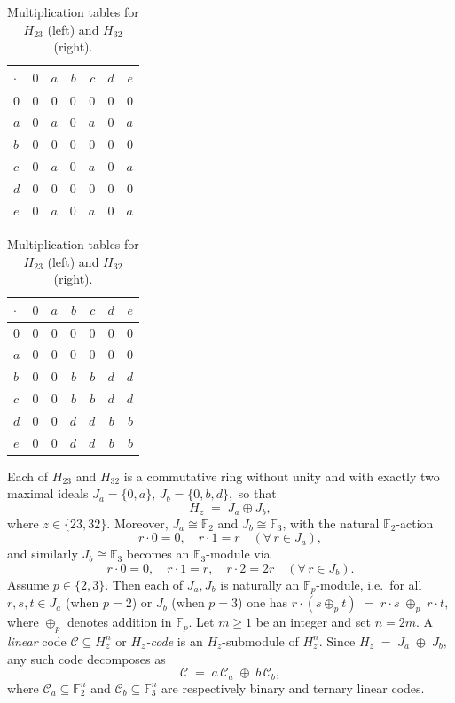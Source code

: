 \documentclass[11pt,a4paper]{article}
\theoremstyle{definition}
\numberwithin{equation}{section}
\newcommand{\F}{\mathbb{F}}
\def\C{{\mathcal{C}}}
\begin{document}
\begin{table}[h]
\centering
\begin{minipage}{0.47\linewidth}
\centering
\label{tab:mult}
\begin{tabular}{lrrrrrr}
\toprule
$\cdot$ & $0$ & $a$ & $b$ & $c$ & $d$ & $e$ \\
\midrule
$0$ & $0$ & $0$ & $0$ & $0$ & $0$ & $0$ \\
$a$ & $0$ & $a$ & $0$ & $a$ & $0$ & $a$ \\ 
$b$ & $0$ & $0$ & $0$ & $0$ & $0$ & $0$ \\
$c$ & $0$ & $a$ & $0$ & $a$ & $0$ & $a$ \\
$d$ & $0$ & $0$ & $0$ & $0$ & $0$ & $0$ \\
$e$ & $0$ & $a$ & $0$ & $a$ & $0$ & $a$ \\
\bottomrule
\end{tabular}
\end{minipage}\hfill
\begin{minipage}{0.47\linewidth}
\centering
\begin{tabular}{lrrrrrr}
\toprule
$\cdot$ & $0$ & $a$ & $b$ & $c$ & $d$ & $e$ \\
\midrule
$0$ & $0$ & $0$ & $0$ & $0$ & $0$ & $0$ \\
$a$ & $0$ & $0$ & $0$ & $0$ & $0$ & $0$ \\ 
$b$ & $0$ & $0$ & $b$ & $b$ & $d$ & $d$ \\
$c$ & $0$ & $0$ & $b$ & $b$ & $d$ & $d$ \\
$d$ & $0$ & $0$ & $d$ & $d$ & $b$ & $b$ \\
$e$ & $0$ & $0$ & $d$ & $d$ & $b$ & $b$ \\
\bottomrule
\end{tabular}
\end{minipage}
\caption{Multiplication tables for $H_{23}$ (left) and $H_{32}$ (right).}
\label{tab:mult}
\end{table}
\newpage
Each of \(H_{23}\) and \(H_{32}\) is a commutative ring without unity and with exactly two maximal ideals $J_a = \{0,a\}, \, J_b = \{0,b,d\},$
so that
\[
H_z \;=\; J_a \oplus J_b,
\]
where $z\in\{23,32\}$. Moreover, \(J_a \cong \mathbb{F}_2\) and \(J_b \cong \mathbb{F}_3\),  with the natural \(\F_2\)-action
\[
r\cdot 0 = 0,\quad r\cdot1 = r
\quad(\forall\,r\in J_a),
\]
and similarly \(J_b\cong\mathbb{F}_3\) becomes an \(\F_3\)-module via
\[
r\cdot 0 = 0,\quad r\cdot1 = r,\quad r\cdot2 = 2r
\quad(\forall\,r\in J_b).
\]
Assume \(p\in\{2,3\}\). Then each of \(J_a,J_b\) is naturally an \(\F_p\)-module, i.e.\ for all \(r,s,t\in J_a\) (when \(p=2\)) or \(J_b\) (when \(p=3\)) one has $r\cdot(s\oplus_p t)
\;=\;
r\cdot s\;\oplus_p\;r\cdot t,$ where \(\oplus_p\) denotes addition in \(\F_p\). 
Let \(m\ge1\) be an integer and set \(n=2m\).  A\emph{ linear} code \(\C\subseteq H_z^n\) or\emph{ $H_z$-code}  is  an \(H_z\)-submodule of \(H_z^n\).  Since $H_z \;=\; J_a \;\oplus\; J_b,$ any such code decomposes as
\[
\C
\;=\;
a\,\C_a
\;\oplus\;
b\,\C_b,
\]
where \(\C_a\subseteq\F_2^n\) and \(\C_b\subseteq\F_3^n\) are respectively binary and ternary linear codes.
\end{document}
